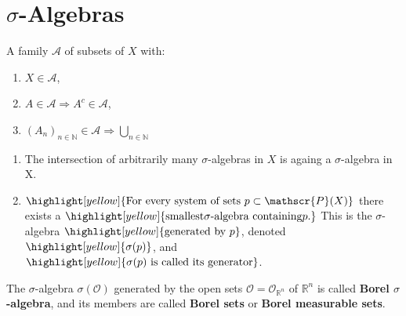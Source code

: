 \section{\(\sigma\)-Algebras}
\begin{definition}
    A family \(\mathscr{A}\) of subsets of \(X\) with:
    \begin{enumerate}[label=(\roman*)]
        \item \(X\in\mathscr{A}\), \label{ax:sigma1}
        \item \(A\in\mathscr{A} \Rightarrow A^c \in\mathscr{A}\), \label{ax:sigma2}
        \item \(\left( A_n \right)_{n\in\mathbb{N}} \in\mathscr{A} \Rightarrow \bigcup\limits_{n\in\mathbb{N}} \)
    \end{enumerate}
\end{definition}
\begin{theorem}
    \quad 

    \begin{enumerate}[label=(\roman*)]
        \item The intersection of arbitrarily many \(\sigma\)-algebras in \(X\) is againg a \(\sigma\)-algebra in X.
        \item \(\highlight[yellow]{\text{For every system of sets }p \subset \mathscr{P}(X)}\) there exists a 
        \(\highlight[yellow]{\text{smallest} \sigma\text{-algebra containing} p. }\) This is the \(\sigma\)-algebra
        \(\highlight[yellow]{\text{generated by } p}\), denoted \(\highlight[yellow]{\sigma(p)}\), and 
        \(\highlight[yellow]{\sigma(p) \text{ is called its generator}}\).
    \end{enumerate}
\end{theorem}
\begin{definition}[Borel]
    The \(\sigma\)-algebra \(\sigma(\mathcal{O})\) generated by the open sets \(\mathcal{O} = \mathcal{O}_{\mathbb{R}^n}\) of $\mathbb{R}^n$
    is called \textbf{Borel $\sigma$-algebra}, and its members are called \textbf{Borel sets} or
    \textbf{Borel measurable sets}.
\end{definition}